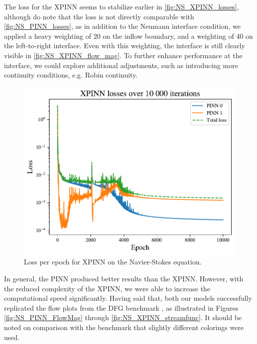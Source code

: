 The loss for the XPINN seems to stabilize earlier in \autoref{fig:NS_XPINN_losses}, although do note that the loss is not directly comparable with \autoref{fig:NS_PINN_losses}, as in addition to the Neumann interface condition, we applied a heavy weighting of 20 on the inflow boundary, and a weighting of 40 on the left-to-right interface.
Even with this weighting, the interface is still clearly visible in \autoref{fig:NS_XPINN_flow_mag}.
To further enhance performance at the interface, we could explore additional adjustments, such as introducing more continuity conditions, e.g. Robin continuity.

\begin{figure}[h]
    \centering
    \includegraphics[width=\linewidth]{Project1XPINNs/figures/NavierStokes/TwoBoxDecomp/TB_10000_iter_right_emphasis/losses/TwoBox_decomp_losses.pdf}
    \caption{Loss per epoch for XPINN on the Navier-Stokes equation.}
    \label{fig:NS_XPINN_losses}
\end{figure}

In general, the PINN produced better results than the XPINN.
However, with the reduced complexity of the XPINN, we were able to increase the computational speed significantly.
Having said that, both our models successfully replicated the flow plots from the DFG benchmark  \cite{DFG}, as illustrated in Figures \ref{fig:NS_PINN_FlowMag} through \ref{fig:NS_XPINN_streamfunc}.
It should be noted on comparison with the benchmark that slightly different colorings were used.

